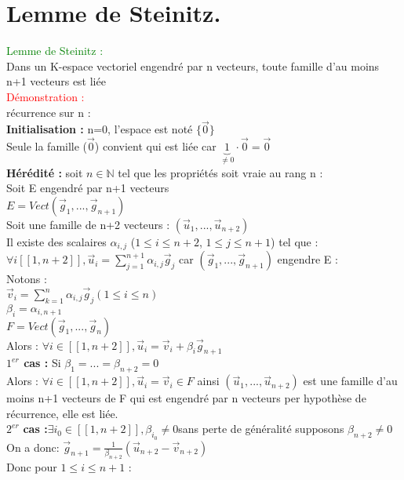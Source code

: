 \documentclass{article}
\begin{document}
\section{Lemme de Steinitz.}
\textcolor{green}{Lemme de Steinitz :} \\
Dans un K-espace vectoriel engendré par n vecteurs, toute famille d'au moins n+1 vecteurs est liée \\
\textcolor{red}{Démonstration :} \\
récurrence sur n : \\
{\bf Initialisation :}  n=0, l'espace est noté $ \lbrace  \vec 0 \rbrace $ \\
Seule la famille ($\vec 0$) convient qui est liée car $\underbrace{1}_{\neq 0}\cdot \vec 0= \vec 0$ \\
{\bf Hérédité : } soit $n \in \mathbb N$ tel que les propriétés soit vraie au rang n : \\
Soit E engendré par n+1 vecteurs \\
$E=Vect(\vec g_1,...,\vec g_{n+1})$ \\
Soit une famille de n+2 vecteurs : $(\vec u_1,...,\vec u_{n+2})$ \\
Il existe des scalaires $\alpha_{i,j}$ ($1 \leq i \leq n+2$, $1 \leq j \leq n+1$) tel que : \\
$\forall i [[1,n+2]], \vec u_i= \sum_{j=1}^{n+1} \alpha_{i,j} \vec g_j$ car $(\vec g_1,...,\vec g_{n+1})$ engendre E : \\
Notons : \\
$\vec v_i=\sum_{k=1}^n \alpha_{i,j} \vec g_j (1 \leq i \leq n)$ \\
$\beta_i=\alpha_{i,n+1}$ \\
$F=Vect(\vec g_1,...,\vec g_n)$ \\
Alors : $\forall i \in [[1,n+2]], \vec u_i=\vec v_i + \beta_i \vec g_{n+1}$ \\
{\boldmath \bf $1^{er}$ cas :} Si $\beta_1=...=\beta_{n+2}=0$ \\
Alors : $\forall i \in [[1,n+2]], \vec u_i=\vec v_i \in F$ ainsi $(\vec u_1,..., \vec u_{n+2})$ est une famille d'au moins n+1 vecteurs de F qui est engendré par n vecteurs per hypothèse de récurrence, elle est liée. \\
{\boldmath $2^{er}$ \bf cas :}$\exists i_0 \in [[1,n+2]], \beta_{i_0}\neq 0$sans perte de généralité supposons $\beta_{n+2}\neq 0$ \\
On a donc: $\vec g_{n+1}= \frac{1}{\beta_{n+2}}(\vec u_{n+2}-\vec v_{n+2})$ \\
Donc pour $1 \leq i \leq n+1$ : \\
\end{document}
